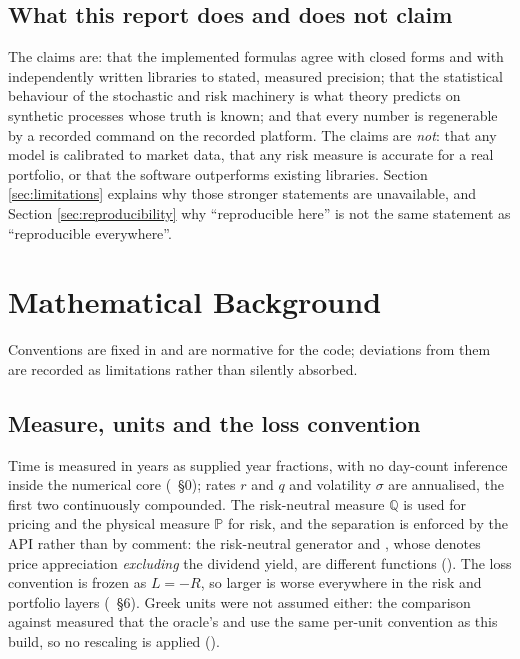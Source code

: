 \documentclass[11pt,a4paper]{article}
\begin{document}
\subsection{What this report does and does not claim}
The claims are: that the implemented formulas agree with closed forms and with independently
written libraries to stated, measured precision; that the statistical behaviour of the stochastic
and risk machinery is what theory predicts on synthetic processes whose truth is known; and that
every number is regenerable by a recorded command on the recorded platform. The claims are
\emph{not}: that any model is calibrated to market data, that any risk measure is accurate for a
real portfolio, or that the software outperforms existing libraries. Section \ref{sec:limitations} explains why those
stronger statements are unavailable, and Section \ref{sec:reproducibility} why ``reproducible
here'' is not the same statement as ``reproducible everywhere''.

\section{Mathematical Background}
\label{sec:mathematics}

Conventions are fixed in  and are normative for the
code; deviations from them are recorded as limitations rather than silently absorbed.

\subsection{Measure, units and the loss convention}
Time is measured in years as supplied year fractions, with no day-count inference inside the
numerical core (~\S0); rates $r$ and $q$ and volatility
$\sigma$ are annualised, the first two continuously compounded. The risk-neutral measure
$\mathbb{Q}$ is used for pricing and the physical measure $\mathbb{P}$ for risk, and the
separation is enforced by the API rather than by comment: the risk-neutral generator and
, whose  denotes price appreciation
\emph{excluding} the dividend yield, are different functions
(). The loss convention is frozen as
$L = -R$, so larger is worse everywhere in the risk and portfolio layers
(~\S6). Greek units were not assumed either: the
comparison against  measured that
the oracle's  and  use the same per-unit convention as this build,
so no rescaling is applied ().
\end{document}
